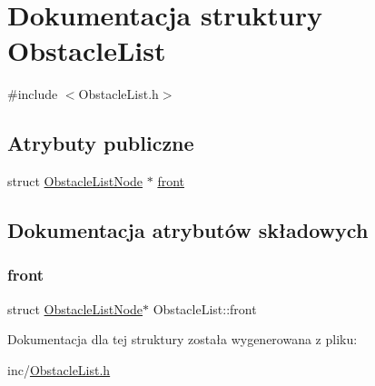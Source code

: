 \hypertarget{struct_obstacle_list}{}\section{Dokumentacja struktury Obstacle\+List}
\label{struct_obstacle_list}


{\ttfamily \#include $<$Obstacle\+List.\+h$>$}

\subsection*{Atrybuty publiczne}
\begin{DoxyCompactItemize}
\item 
struct \mbox{\hyperlink{struct_obstacle_list_node}{Obstacle\+List\+Node}} $\ast$ \mbox{\hyperlink{struct_obstacle_list_ab179ad67363ef3547b0ee2207623956f}{front}}
\end{DoxyCompactItemize}


\subsection{Dokumentacja atrybutów składowych}
\mbox{\label{struct_obstacle_list_ab179ad67363ef3547b0ee2207623956f}} 
\subsubsection{\texorpdfstring{front}{front}}
{\footnotesize\ttfamily struct \mbox{\hyperlink{struct_obstacle_list_node}{Obstacle\+List\+Node}}$\ast$ Obstacle\+List\+::front}



Dokumentacja dla tej struktury została wygenerowana z pliku\+:\begin{DoxyCompactItemize}
\item 
inc/\mbox{\hyperlink{_obstacle_list_8h}{Obstacle\+List.\+h}}\end{DoxyCompactItemize}
